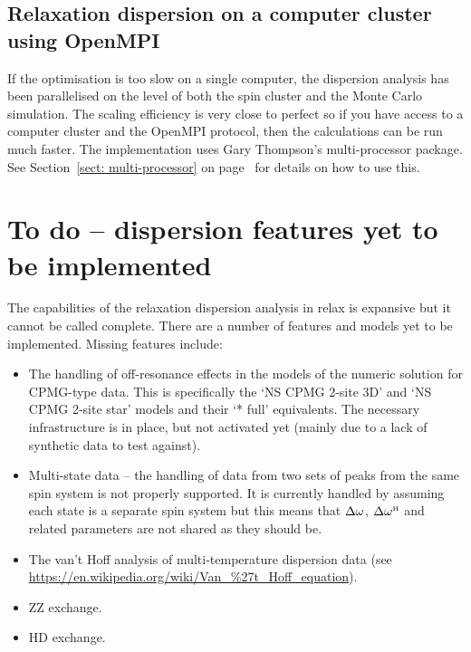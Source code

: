 
\subsection{Relaxation dispersion on a computer cluster using OpenMPI}

If the optimisation is too slow on a single computer, the dispersion analysis has been parallelised on the level of both the spin cluster and the Monte Carlo simulation.
The scaling efficiency is very close to perfect so if you have access to a computer cluster and the OpenMPI protocol, then the calculations can be run much faster.
The implementation uses Gary Thompson's multi-processor package.
See Section~\ref{sect: multi-processor} on page~\pageref{sect: multi-processor} for details on how to use this.




\section{To do -- dispersion features yet to be implemented}
\label{sect: dispersion: TODO}

The capabilities of the relaxation dispersion analysis in relax is expansive but it cannot be called complete.
There are a number of features and models yet to be implemented.
Missing features include:
\begin{itemize}
\item The handling of off-resonance effects in the models of the numeric solution for CPMG-type data.
This is specifically the `NS CPMG 2-site 3D' and `NS CPMG 2-site star' models and their `* full' equivalents.
The necessary infrastructure is in place, but not activated yet (mainly due to a lack of synthetic data to test against).
\item Multi-state data -- the handling of data from two sets of peaks from the same spin system is not properly supported.
It is currently handled by assuming each state is a separate spin system but this means that $\Delta\omega$, $\Delta\omega^{\scriptscriptstyle\mathrm{H}}$ and related parameters are not shared as they should be.
\item The van't Hoff analysis of multi-temperature dispersion data (see \url{https://en.wikipedia.org/wiki/Van\_\%27t\_Hoff\_equation}).
\item ZZ exchange.
\item HD exchange.
\end{itemize}

